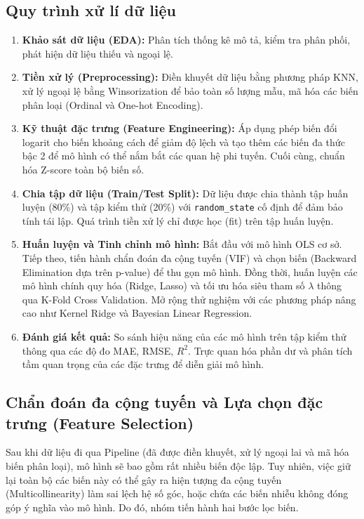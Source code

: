 \subsection{Quy trình xử lí dữ liệu}
\begin{enumerate}
    \item \textbf{Khảo sát dữ liệu (EDA):} Phân tích thống kê mô tả, kiểm tra phân phối, phát hiện dữ liệu thiếu và ngoại lệ.
    \item \textbf{Tiền xử lý (Preprocessing):} Điền khuyết dữ liệu bằng phương pháp KNN, xử lý ngoại lệ bằng Winsorization để bảo toàn số lượng mẫu, mã hóa các biến phân loại (Ordinal và One-hot Encoding).
    \item \textbf{Kỹ thuật đặc trưng (Feature Engineering):} Áp dụng phép biến đổi logarit cho biến khoảng cách để giảm độ lệch và tạo thêm các biến đa thức bậc 2 để mô hình có thể nắm bắt các quan hệ phi tuyến. Cuối cùng, chuẩn hóa Z-score toàn bộ biến số.
    \item \textbf{Chia tập dữ liệu (Train/Test Split):} Dữ liệu được chia thành tập huấn luyện (80\%) và tập kiểm thử (20\%) với \texttt{random\_state} cố định để đảm bảo tính tái lập. Quá trình tiền xử lý chỉ được học (fit) trên tập huấn luyện.
    \item \textbf{Huấn luyện và Tinh chỉnh mô hình:} Bắt đầu với mô hình OLS cơ sở. Tiếp theo, tiến hành chẩn đoán đa cộng tuyến (VIF) và chọn biến (Backward Elimination dựa trên p-value) để thu gọn mô hình. Đồng thời, huấn luyện các mô hình chính quy hóa (Ridge, Lasso) và tối ưu hóa siêu tham số $\lambda$ thông qua K-Fold Cross Validation. Mở rộng thử nghiệm với các phương pháp nâng cao như Kernel Ridge và Bayesian Linear Regression.
    \item \textbf{Đánh giá kết quả:} So sánh hiệu năng của các mô hình trên tập kiểm thử thông qua các độ đo MAE, RMSE, $R^2$. Trực quan hóa phần dư và phân tích tầm quan trọng của các đặc trưng để diễn giải mô hình.
\end{enumerate}

\subsection{Chẩn đoán đa cộng tuyến và Lựa chọn đặc trưng (Feature Selection)}

Sau khi dữ liệu đi qua Pipeline (đã được điền khuyết, xử lý ngoại lai và mã hóa biến phân loại), mô hình sẽ bao gồm rất nhiều biến độc lập. Tuy nhiên, việc giữ lại toàn bộ các biến này có thể gây ra hiện tượng đa cộng tuyến (Multicollinearity) làm sai lệch hệ số góc, hoặc chứa các biến nhiễu không đóng góp ý nghĩa vào mô hình. Do đó, nhóm tiến hành hai bước lọc biến.

